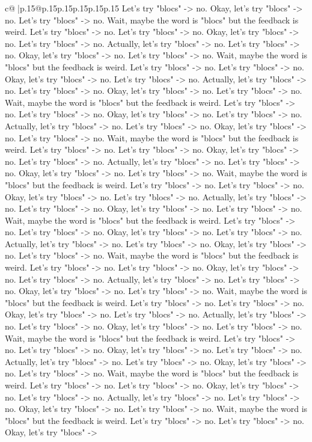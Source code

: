 \documentclass{article}
\begin{document}
{\begin{supertabular}{c@{$\;$}|p{.15\linewidth}@{}p{.15\linewidth}p{.15\linewidth}p{.15\linewidth}p{.15\linewidth}p{.15\linewidth}}
{{{Let's try "blocs" {-}> no. Okay, let's try "blocs" {-}> no. Let's try "blocs" {-}> no. Wait, maybe the word is "blocs" but the feedback is weird. Let's try "blocs" {-}> no. Let's try "blocs" {-}> no. Okay, let's try "blocs" {-}> no. Let's try "blocs" {-}> no. Actually, let's try "blocs" {-}> no. Let's try "blocs" {-}> no. Okay, let's try "blocs" {-}> no. Let's try "blocs" {-}> no. Wait, maybe the word is "blocs" but the feedback is weird. Let's try "blocs" {-}> no. Let's try "blocs" {-}> no. Okay, let's try "blocs" {-}> no. Let's try "blocs" {-}> no. Actually, let's try "blocs" {-}> no. Let's try "blocs" {-}> no. Okay, let's try "blocs" {-}> no. Let's try "blocs" {-}> no. Wait, maybe the word is "blocs" but the feedback is weird. Let's try "blocs" {-}> no. Let's try "blocs" {-}> no. Okay, let's try "blocs" {-}> no. Let's try "blocs" {-}> no. Actually, let's try "blocs" {-}> no. Let's try "blocs" {-}> no. Okay, let's try "blocs" {-}> no. Let's try "blocs" {-}> no. Wait, maybe the word is "blocs" but the feedback is weird. Let's try "blocs" {-}> no. Let's try "blocs" {-}> no. Okay, let's try "blocs" {-}> no. Let's try "blocs" {-}> no. Actually, let's try "blocs" {-}> no. Let's try "blocs" {-}> no. Okay, let's try "blocs" {-}> no. Let's try "blocs" {-}> no. Wait, maybe the word is "blocs" but the feedback is weird. Let's try "blocs" {-}> no. Let's try "blocs" {-}> no. Okay, let's try "blocs" {-}> no. Let's try "blocs" {-}> no. Actually, let's try "blocs" {-}> no. Let's try "blocs" {-}> no. Okay, let's try "blocs" {-}> no. Let's try "blocs" {-}> no. Wait, maybe the word is "blocs" but the feedback is weird. Let's try "blocs" {-}> no. Let's try "blocs" {-}> no. Okay, let's try "blocs" {-}> no. Let's try "blocs" {-}> no. Actually, let's try "blocs" {-}> no. Let's try "blocs" {-}> no. Okay, let's try "blocs" {-}> no. Let's try "blocs" {-}> no. Wait, maybe the word is "blocs" but the feedback is weird. Let's try "blocs" {-}> no. Let's try "blocs" {-}> no. Okay, let's try "blocs" {-}> no. Let's try "blocs" {-}> no. Actually, let's try "blocs" {-}> no. Let's try "blocs" {-}> no. Okay, let's try "blocs" {-}> no. Let's try "blocs" {-}> no. Wait, maybe the word is "blocs" but the feedback is weird. Let's try "blocs" {-}> no. Let's try "blocs" {-}> no. Okay, let's try "blocs" {-}> no. Let's try "blocs" {-}> no. Actually, let's try "blocs" {-}> no. Let's try "blocs" {-}> no. Okay, let's try "blocs" {-}> no. Let's try "blocs" {-}> no. Wait, maybe the word is "blocs" but the feedback is weird. Let's try "blocs" {-}> no. Let's try "blocs" {-}> no. Okay, let's try "blocs" {-}> no. Let's try "blocs" {-}> no. Actually, let's try "blocs" {-}> no. Let's try "blocs" {-}> no. Okay, let's try "blocs" {-}> no. Let's try "blocs" {-}> no. Wait, maybe the word is "blocs" but the feedback is weird. Let's try "blocs" {-}> no. Let's try "blocs" {-}> no. Okay, let's try "blocs" {-}> no. Let's try "blocs" {-}> no. Actually, let's try "blocs" {-}> no. Let's try "blocs" {-}> no. Okay, let's try "blocs" {-}> no. Let's try "blocs" {-}> no. Wait, maybe the word is "blocs" but the feedback is weird. Let's try "blocs" {-}> no. Let's try "blocs" {-}> no. Okay, let's try "blocs" {-}> }}}
\end{supertabular}}
\end{document}
